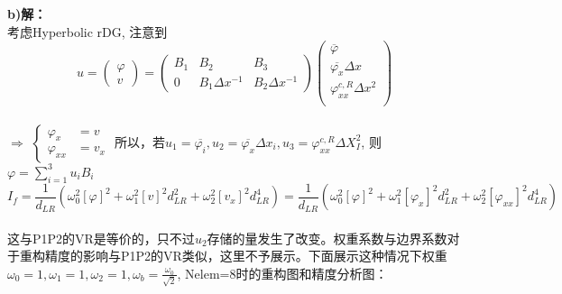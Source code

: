 \documentclass[a4paper,11pt,UTF8]{article}%
\theoremstyle{plain}
\begin{document}
\vspace{10em}
\noindent \textbf{b)解：}\\
考虑Hyperbolic rDG, 注意到\\
$$u=\begin{pmatrix}
	\varphi\\
	v
\end{pmatrix}=
\begin{pmatrix}
	B_1&B_2&B_3\\
	0&B_1\Delta x^{-1}& B_2 \Delta x^{-1}
\end{pmatrix}
\begin{pmatrix}
	\overline{\varphi}\\
	\overline{\varphi_x}\Delta x\\
	\varphi^{c,R}_{xx}\Delta x^2\\
\end{pmatrix}$$\\
$\Rightarrow$ $\left\{
\begin{aligned}
	\varphi_x&=v\\
	\varphi_{xx}&=v_x
\end{aligned}
\right.$ 所以，若$u_1=\overline{\varphi_i},u_2=\overline{\varphi_x}\Delta x_i, u_3=\varphi_{xx}^{c,R}\Delta X^2_I$,	则$\varphi=\sum_{i=1}^{3}u_iB_i$\\
$$I_f=\frac{1}{d_{LR}}\left(\omega^2_0\left[\varphi\right]^2+\omega^2_1\left[v\right]^2d^2_{LR}+\omega_2^2\left[v_{x}\right]^2d^4_{LR}\right)=\frac{1}{d_{LR}}\left(\omega^2_0\left[\varphi\right]^2+\omega^2_1\left[\varphi_x\right]^2d^2_{LR}+\omega_2^2\left[\varphi_{xx}\right]^2d^4_{LR}\right)$$\\
\indent 这与P1P2的VR是等价的，只不过$u_2$存储的量发生了改变。权重系数与边界系数对于重构精度的影响与P1P2的VR类似，这里不予展示。下面展示这种情况下权重$\omega_0=1, \omega_1=1, \omega_2=1, \omega_b=\frac{\omega_0}{\sqrt{2}}$, Nelem=8时的重构图和精度分析图：\\
\end{document}
